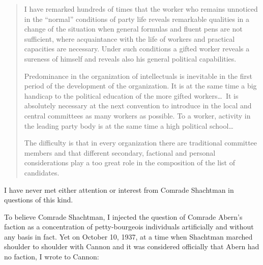 \begin{quote}
  I have remarked hundreds of times that the worker who remains unnoticed in the ``normal'' conditions of party life reveals remarkable qualities in a change of the situation when general formulas and fluent pens are not sufficient, where acquaintance with the life of workers and practical capacities are necessary. Under such conditions a gifted worker reveals a sureness of himself and reveals also his general political capabilities.
  
  Predominance in the organization of intellectuals is inevitable in the first period of the development of the organization. It is at the same time a big handicap to the political education of the more gifted workers\dots\ It is absolutely necessary at the next convention to introduce in the local and central committees as many workers as possible. To a worker, activity in the leading party body is at the same time a high political school\dots
  
  The difficulty is that in every organization there are traditional committee members and that different secondary, factional and personal considerations play a too great role in the composition of the list of candidates.
\end{quote}

I have never met either attention or interest from Comrade Shachtman in questions of this kind.


\noindent
To believe Comrade Shachtman, I injected the question of Comrade Abern’s faction as a concentration of petty-bourgeois individuals artificially and without any basis in fact. Yet on October 10, 1937, at a time when Shachtman marched shoulder to shoulder with Cannon and it was considered officially that Abern had no faction, I wrote to Cannon:

